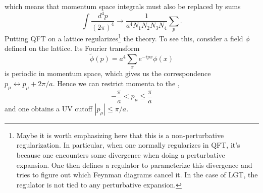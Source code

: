 which means that momentum space integrals must also be replaced by
sums
\begin{equation}
  \int\frac{d^4p}{(2\pi)^4}\to
  \frac{1}{a^4N_1N_2N_3N_4}\sum_p. 
\end{equation}
Putting QFT on a lattice regularizes\footnote{Maybe it is worth
emphasizing here that this is a non-perturbative regularization. 
In particular, when one normally regularizes in QFT, it's because
one encounters some divergence when doing a perturbative
expansion. One then defines a regulator to parameterize this
divergence and tries to figure out which Feynman diagrams 
cancel it. In the case of LGT, the regulator is not tied to
any perturbative expansion.} the theory. 
To see this, consider a field $\phi$ defined on the lattice. 
Its Fourier transform
\begin{equation}
  \widetilde{\phi}(p)=a^4\sum_xe^{-ipx}\phi(x)
\end{equation}
is periodic in momentum space, which gives us the correspondence
$p_\mu\leftrightarrow p_\mu+2\pi/a$. Hence we can restrict
momenta to the ,
\begin{equation}
 -\frac{\pi}{a}<p_\mu\le\frac{\pi}{a}
\end{equation}
and one obtains a UV cutoff $|p_\mu|\le\pi/a$.


